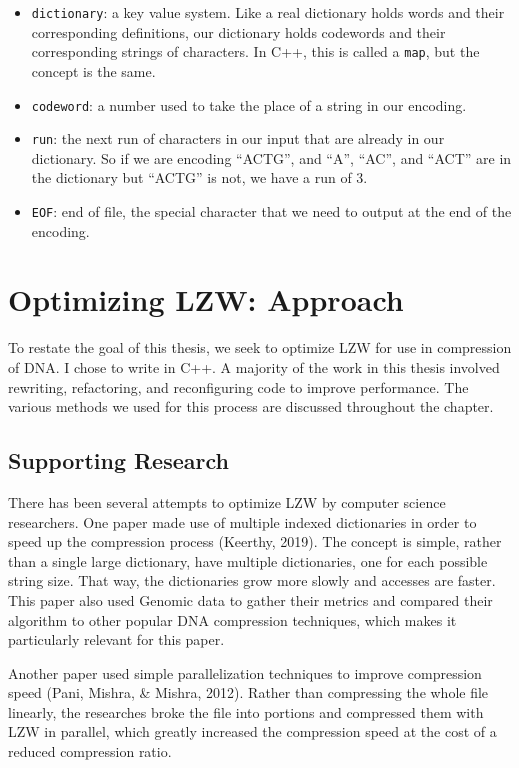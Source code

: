 \documentclass[12pt,twoside]{reedthesis}
\providecommand{\tightlist}{%
  \setlength{\itemsep}{0pt}\setlength{\parskip}{0pt}}
\begin{document}
\begin{itemize}
\tightlist
\item
  \texttt{dictionary}: a key value system. Like a real dictionary holds words and their corresponding definitions, our dictionary holds codewords and their corresponding strings of characters. In C++, this is called a \texttt{map}, but the concept is the same.
\item
  \texttt{codeword}: a number used to take the place of a string in our encoding.
\item
  \texttt{run}: the next run of characters in our input that are already in our dictionary. So if we are encoding ``ACTG'', and ``A'', ``AC'', and ``ACT'' are in the dictionary but ``ACTG'' is not, we have a run of 3.
\item
  \texttt{EOF}: end of file, the special character that we need to output at the end of the encoding.
\end{itemize}
\hypertarget{optimizing-lzw-approach}{%
\chapter{Optimizing LZW: Approach}\label{optimizing-lzw-approach}}

To restate the goal of this thesis, we seek to optimize LZW for use in compression of DNA. I chose to write in C++. A majority of the work in this thesis involved rewriting, refactoring, and reconfiguring code to improve performance. The various methods we used for this process are discussed throughout the chapter.

\hypertarget{supporting-research}{%
\section{Supporting Research}\label{supporting-research}}

There has been several attempts to optimize LZW by computer science researchers. One paper made use of multiple indexed dictionaries in order to speed up the compression process (Keerthy, 2019). The concept is simple, rather than a single large dictionary, have multiple dictionaries, one for each possible string size. That way, the dictionaries grow more slowly and accesses are faster. This paper also used Genomic data to gather their metrics and compared their algorithm to other popular DNA compression techniques, which makes it particularly relevant for this paper.

Another paper used simple parallelization techniques to improve compression speed (Pani, Mishra, \& Mishra, 2012). Rather than compressing the whole file linearly, the researches broke the file into portions and compressed them with LZW in parallel, which greatly increased the compression speed at the cost of a reduced compression ratio.
\end{document}
